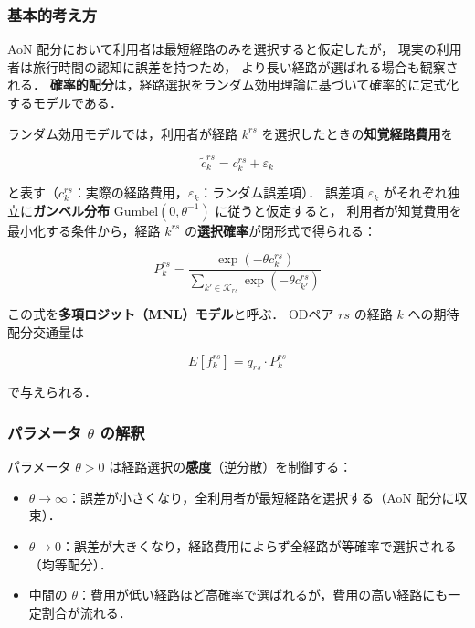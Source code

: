 \subsubsection*{基本的考え方}

AoN 配分において利用者は最短経路のみを選択すると仮定したが，
現実の利用者は旅行時間の認知に誤差を持つため，
より長い経路が選ばれる場合も観察される．
\textbf{確率的配分}は，経路選択をランダム効用理論に基づいて確率的に定式化するモデルである\cite{McFadden1974,Daganzo1977}．

ランダム効用モデルでは，利用者が経路 $k^{rs}$ を選択したときの\textbf{知覚経路費用}を

\begin{equation}
  \tilde{c}_k^{rs} = c_k^{rs} + \varepsilon_k
  \label{eq:perceived-cost}
\end{equation}

と表す（$c_k^{rs}$：実際の経路費用，$\varepsilon_k$：ランダム誤差項）．
誤差項 $\varepsilon_k$ がそれぞれ独立に\textbf{ガンベル分布}
$\mathrm{Gumbel}(0, \theta^{-1})$ に従うと仮定すると，
利用者が知覚費用を最小化する条件から，経路 $k^{rs}$ の\textbf{選択確率}が閉形式で得られる\cite{McFadden1974}：

\begin{equation}
  P_k^{rs} = \frac{\exp(-\theta c_k^{rs})}{\displaystyle\sum_{k' \in \mathcal{K}_{rs}} \exp(-\theta c_{k'}^{rs})}
  \label{eq:logit-prob-fi}
\end{equation}

この式を\textbf{多項ロジット（MNL）モデル}と呼ぶ．
ODペア $rs$ の経路 $k$ への期待配分交通量は

\begin{equation}
  E[f_k^{rs}] = q_{rs} \cdot P_k^{rs}
  \label{eq:logit-flow}
\end{equation}

で与えられる．

\subsubsection*{パラメータ $\theta$ の解釈}

パラメータ $\theta > 0$ は経路選択の\textbf{感度}（逆分散）を制御する：

\begin{itemize}
  \item $\theta \to \infty$：誤差が小さくなり，全利用者が最短経路を選択する（AoN 配分に収束）．
  \item $\theta \to 0$：誤差が大きくなり，経路費用によらず全経路が等確率で選択される（均等配分）．
  \item 中間の $\theta$：費用が低い経路ほど高確率で選ばれるが，費用の高い経路にも一定割合が流れる．
\end{itemize}

